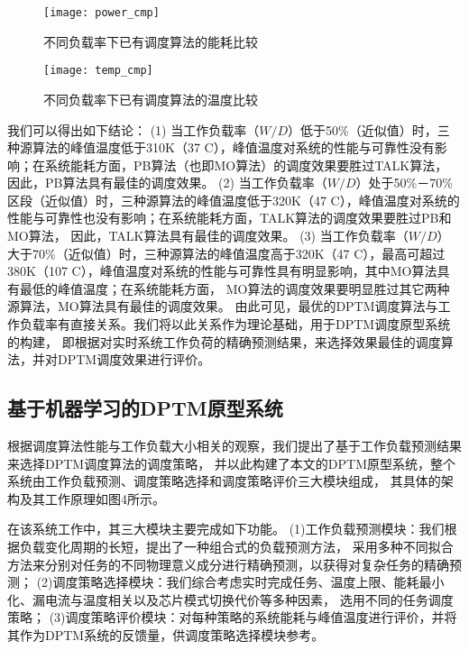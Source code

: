 \begin{figure}%
  \centering
  \texttt{[image: power\_cmp]}
  \caption{不同负载率下已有调度算法的能耗比较}
  \label{fig:exp_power_cmp}
\end{figure}


\begin{figure}%
  \centering
  \texttt{[image: temp\_cmp]}
  \caption{不同负载率下已有调度算法的温度比较}
  \label{fig:exp_temp_cmp}
\end{figure}

我们可以得出如下结论：
(1)	当工作负载率（$W/D$）低于50\%（近似值）时，三种源算法的峰值温度低于310K（37 C），峰值温度对系统的性能与可靠性没有影响；在系统能耗方面，PB算法（也即MO算法）的调度效果要胜过TALK算法， 因此，PB算法具有最佳的调度效果。
(2)	当工作负载率（$W/D$）处于50\%－70\%区段（近似值）时，三种源算法的峰值温度低于320K（47 C），峰值温度对系统的性能与可靠性也没有影响；在系统能耗方面，TALK算法的调度效果要胜过PB和MO算法， 因此，TALK算法具有最佳的调度效果。
(3)	当工作负载率（$W/D$）大于70\%（近似值）时，三种源算法的峰值温度高于320K（47 C），最高可超过380K（107 C），峰值温度对系统的性能与可靠性具有明显影响，其中MO算法具有最低的峰值温度；在系统能耗方面， MO算法的调度效果要明显胜过其它两种源算法，MO算法具有最佳的调度效果。
由此可见，最优的DPTM调度算法与工作负载率有直接关系。我们将以此关系作为理论基础，用于DPTM调度原型系统的构建， 即根据对实时系统工作负荷的精确预测结果，来选择效果最佳的调度算法，并对DPTM调度效果进行评价。


\subsection{基于机器学习的DPTM原型系统}

根据调度算法性能与工作负载大小相关的观察，我们提出了基于工作负载预测结果来选择DPTM调度算法的调度策略， 并以此构建了本文的DPTM原型系统，整个系统由工作负载预测、调度策略选择和调度策略评价三大模块组成， 其具体的架构及其工作原理如图4所示。

在该系统工作中，其三大模块主要完成如下功能。 (1)工作负载预测模块：我们根据负载变化周期的长短，提出了一种组合式的负载预测方法， 采用多种不同拟合方法来分别对任务的不同物理意义成分进行精确预测，以获得对复杂任务的精确预测； (2)调度策略选择模块：我们综合考虑实时完成任务、温度上限、能耗最小化、漏电流与温度相关以及芯片模式切换代价等多种因素， 选用不同的任务调度策略； (3)调度策略评价模块：对每种策略的系统能耗与峰值温度进行评价，并将其作为DPTM系统的反馈量，供调度策略选择模块参考。

